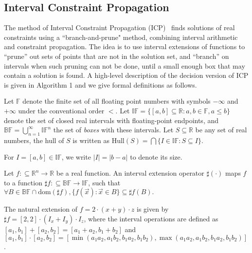 \documentclass[prodmode]{acmsmall} %
\newcommand{\dom}{\mathrm{dom}}
\begin{document}
\subsection{Interval Constraint Propagation}

The method of Interval Constraint Propagation (ICP)~\cite{handbookICP} finds solutions of real constraints using a ``branch-and-prune" method, combining interval arithmetic and constraint propagation. The idea is to use interval extensions of functions to ``prune'' out sets of points that are not in the solution set, and ``branch'' on intervals when such pruning can not be done, until a small enough box that may contain a solution is found. A high-level description of the decision version of ICP is given in Algorithm 1 and we give formal definitions as follows.

\begin{definition}
Let $\mathbb{F}$ denote the finite set of all floating point numbers with symbols $-\infty$ and $+\infty$ under the conventional order $<$. Let
$\mathbb{IF} = \{[a,b]\subseteq \mathbb{R}: a,b\in \mathbb{F}, a\leq b\}$ denote the set of closed real intervals with floating-point endpoints, and $\mathbb{BF} = \bigcup_{n=1}^{\infty}\mathbb{IF}^n$ the set of {\em boxes} with these intervals. Let $S\subseteq \mathbb{R}$ be any set of real numbers, the hull of $S$ is written as $\mathrm{Hull}(S) = \bigcap \{I\in \mathbb{IF}: S\subseteq I\}.$
\end{definition}

For $I= [a, b]\in \mathbb{IF}$, we write $|I| = |b-a|$ to denote its size. 


\begin{definition}
Let $f:\subseteq\mathbb{R}^n\rightarrow \mathbb{R}$ be a real function. An interval extension operator $\sharp(\cdot)$ maps $f$ to a function $\sharp f:\subseteq \mathbb{BF}\rightarrow \mathbb{IF}$, such that 
$\forall B\in\mathbb{BF}\cap \dom(\sharp f), \{f(\vec x):\vec x\in B\}\subseteq \sharp f(B).$
\end{definition}
\begin{example}
The natural extension of $f = 2\cdot(x+y)\cdot z$ is given by $\sharp f = [2,2]\cdot(I_x+I_y)\cdot I_z$, where the interval operations are defined as $[a_1,b_1]+[a_2, b_2] = [a_1+a_2, b_1+b_2]$ and $[a_1,b_1]\cdot[a_2,b_2] = [\min(a_1a_2,a_1b_2,b_1a_2,b_1b_2), \max(a_1a_2,a_1b_2,b_1a_2,b_1b_2)]$. 
\end{example}
\end{document}
